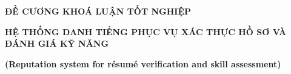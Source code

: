 \documentclass{article}[14pt]
\begin{document}
    \begin{figure}[h]
        \begin{floatrow}
        {%
    
        }
        {%
    
        }
        \end{floatrow}
    \end{figure}
    
    \begin{center}
        \textbf{\huge ĐỀ CƯƠNG KHOÁ LUẬN TỐT NGHIỆP} \\ 
    \end{center}
    
    \begin{center}   
        \textbf{\Large HỆ THỐNG DANH TIẾNG PHỤC VỤ XÁC THỰC HỒ SƠ VÀ ĐÁNH GIÁ KỸ NĂNG} \\
        \vspace{.5cm}

        \textbf{\Large (Reputation system for résumé verification and skill assessment)}
    \end{center}
    
    \vspace{.5cm}
    
    \Large
\end{document}
